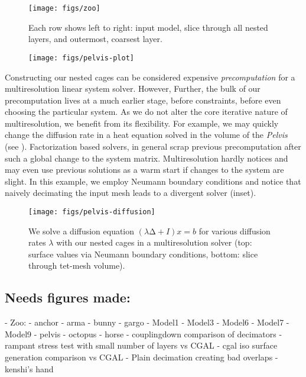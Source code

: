 



\begin{figure*}
  \texttt{[image: figs/zoo]}
  \caption{Each row shows left to right: input model, slice through all nested
  layers, and outermost, coarsest layer.}
  \label{fig:zoo}
\end{figure*}

\begin{wrapfigure}{r}{1.02in}
%
\centering
%
\texttt{[image: figs/pelvis-plot]}
%
\end{wrapfigure}
%
Constructing our nested cages can be considered expensive \emph{precomputation}
for a multiresolution linear system solver.
%
However, 
%
Further, the bulk of our precomputation lives at a much earlier stage, before
constraints, before even choosing the particular system.
%
As we do not alter the core iterative nature of multiresolution, we benefit
from its flexibility. For example, we may quickly change the diffusion rate in
a heat equation solved in the volume of the \emph{Pelvis} (see
). 
%
Factorization based solvers, in general scrap previous precomputation after
such a global change to the system matrix. 
%
Multiresolution hardly notices and may even use previous solutions as a warm
start if changes to the system are slight.
%
In this example, we employ Neumann boundary conditions and notice that naively
decimating the input mesh leads to a divergent solver (inset).

\begin{figure}
  \texttt{[image: figs/pelvis-diffusion]}
  \caption{We solve a diffusion equation $(λ∆+I) x = b$ for various diffusion
  rates $λ$ with our nested cages in a multiresolution solver (top: surface
  values via Neumann boundary conditions, bottom: slice through tet-mesh
  volume).}
  \label{fig:pelvis-diffusion}
\end{figure}

\subsection{Needs figures made:}
- Zoo:
  - anchor
  - arma
  - bunny
  - gargo
  - Model1
  - Model3
  - Model6
  - Model7
  - Model9
  - pelvis
  - octopus
  - horse
- couplingdown comparison of decimators
- rampant stress test with small number of layers vs CGAL
- cgal iso surface generation comparison vs CGAL
- Plain decimation creating bad overlaps
- kenshi's hand


